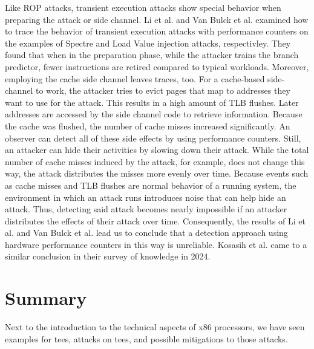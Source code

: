 Like ROP attacks, transient execution attacks show special behavior when
preparing the attack or side channel. Li et al. and Van Bulck et al. examined
how to trace the behavior of transient execution attacks with performance
counters on the examples of Spectre and Load Value injection attacks,
respectivley.\cite{li_detecting_2021, van_bulck_lvi_2020}
They found that when in the preparation phase, while the attacker trains the
branch predictor, fewer instructions are retired compared to typical workloads.
Moreover, employing the cache side channel leaves traces, too. For a cache-based
side-channel to work, the attacker tries to evict pages that map to addresses
they want to use for the attack. This results in a high amount of TLB flushes.
Later addresses are accessed by the side channel code to retrieve information.
Because the cache was flushed, the number of cache misses increased
significantly. An observer can detect all of these side effects by using
performance counters. Still, an attacker can hide their activities by slowing
down their attack. While the total number of cache misses induced by the attack,
for example, does not change this way, the attack distributes the misses more
evenly over time. Because events such as cache misses and TLB flushes are normal
behavior of a running system, the environment in which an attack runs introduces
noise that can help hide an attack. Thus, detecting said attack becomes nearly
impossible if an attacker distributes the effects of their attack over time.
Consequently, the results of Li et al. and Van Bulck et al. lead us to conclude
that a detection approach using hardware performance counters in this way is
unreliable. Kosasih et al. came to a similar conclusion in their survey of
knowledge in 2024.\cite{kosasih2024sok}

\section{Summary}
\label{sec:20:summary}
Next to the introduction to the technical aspects of x86 processors, we have seen
examples for \glspl{tee}, attacks on \glspl{tee}, and possible mitigations to
those attacks. \\

